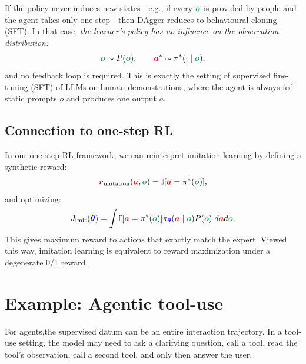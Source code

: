 \documentclass{article}
\newcommand{\colsym}[2]{\ensuremath{\textcolor{#1}{\boldsymbol{#2}}}}
\newcommand{\action}{\colsym{red}{a}}
\newcommand{\obs}{\colsym{ForestGreen}{o}}
\newcommand{\reward}{\colsym{purple}{r}}
\newcommand{\params}{\colsym{blue}{\theta}}
\begin{document}
If the policy never induces new states---e.g., if every $\obs$ is provided by people and the agent takes only one step---then DAgger reduces to behavioural cloning (SFT). In that case, \emph{the learner's policy has no influence on the observation distribution:}
\[
\obs \sim P(\obs), \qquad \action^* \sim \pi^*(\cdot \mid \obs),
\]
and no feedback loop is required. This is exactly the setting of supervised fine-tuning (SFT) of LLMs on human demonstrations, where the agent is always fed static prompts $o$ and produces one output $a$.

\subsection{Connection to one-step RL}

In our one-step RL framework, we can reinterpret imitation learning by defining a synthetic reward:
\[
\reward_{\text{imitation}}(\action, \obs) = \mathbb{I}[\action = \pi^*(\obs)],
\]
and optimizing:
\[
J_{\text{imit}}(\params) = \int \mathbb{I}[\action = \pi^*(\obs)] \pi_{\params}(\action \mid \obs) P(\obs) \; d\action d\obs.
\]
This gives maximum reward to actions that exactly match the expert. Viewed this way, imitation learning is equivalent to reward maximization under a degenerate 0/1 reward. 








\section{Example: Agentic tool-use}
\label{sec:agentic_sft_tool_use}


For agents,the supervised datum can be an entire interaction trajectory. In a tool-use setting, the model may need to ask a clarifying question, call a tool, read the tool's observation, call a second tool, and only then answer the user.
\end{document}
